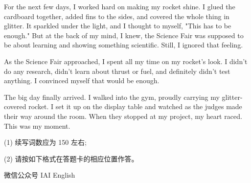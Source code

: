 \documentclass{英语试卷}
\begin{document}
\par For the next few days, I worked hard on making my rocket shine. I glued the cardboard together, added fins to the sides, and covered the whole thing in glitter. It sparkled under the light, and I thought to myself, "This has to be enough." But at the back of my mind, I knew, the Science Fair was supposed to be about learning and showing something scientific. Still, I ignored that feeling.\par
\par As the Science Fair approached, I spent all my time on my rocket's look. I didn't do any research, didn't learn about thrust or fuel, and definitely didn't test anything. I convinced myself that would be enough.\par
\par The big day finally arrived. I walked into the gym, proudly carrying my glitter-covered rocket. I set it up on the display table and watched as the judges made their way around the room. When they stopped at my project, my heart raced. This was my moment.\par
\par (1) 续写词数应为 150 左右;\par
\par (2) 请按如下格式在答题卡的相应位置作答。\par
{}
\par 微信公众号 IAI English\par
{}
\end{document}
